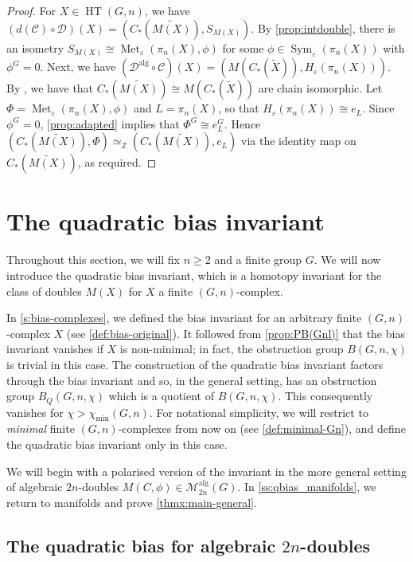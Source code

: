 \documentclass[11pt,a4paper,leqno]{amsart}
\theoremstyle{definition}
\theoremstyle{remark}
\newcommand{\wt}{\widetilde}
\newcommand{\Z}{\mathbb{Z}}
\DeclareMathOperator{\HT}{HT}
\DeclareMathOperator{\alg}{alg}
\newcommand{\Malg}{\mathscr{M}^{\alg}}
\newcommand{\dalg}{\mathscr{D}^{\alg}}
\DeclareMathOperator{\Met}{Met}
\newcommand{\ep}{\varepsilon}
\DeclareMathOperator{\Sym}{Sym}
\begin{document}
\begin{proof}
For $X \in \HT(G,n)$, we have $(d(\mathscr{C}) \circ \mathscr{D})(X) = (C_*(\wt{M(X)}), S_{M(X)})$. By \cref{prop:intdouble}, there is an isometry $S_{M(X)} \cong \Met_\ep(\pi_n(X), \phi)$ for some $\phi\in \Sym_\ep(\pi_n(X))$ with $\phi^G = 0$.
Next, we have $(\dalg \circ \mathscr{C})(X) = (M(C_*(\wt X)),H_\ep(\pi_n(X)))$. By \cite[Proposition II.3]{Kreck:1984}, we have that $C_*(\wt{M(X)}) \cong M(C_*(\wt X))$ are chain isomorphic. 
Let $\Phi = \Met_\ep(\pi_n(X), \phi)$ and $L = \pi_n(X)$, so that $H_\ep(\pi_n(X)) \cong e_L$. Since $\phi^G = 0$, \cref{prop:adapted} implies that $\Phi^G \cong e_L^G$. Hence  $(C_*(\wt{M(X)}),\Phi) \simeq_{\Z} (C_*(\wt{M(X)}),e_L)$ via the identity map on $C_*(\wt{M(X)})$, as required.
\end{proof}

\section{The quadratic bias invariant} \label{s:bias-manifolds}

Throughout this section, we will fix $n \ge 2$ and a finite group $G$. 
We will now introduce the quadratic bias invariant, which is a homotopy invariant for the class of doubles $M(X)$ for $X$ a finite $(G,n)$-complex.

In \cref{s:bias-complexes}, we defined the bias invariant for an arbitrary finite $(G,n)$-complex $X$ (see \cref{def:bias-original}). It followed from \cref{prop:PB(Gnl)} that the bias invariant vanishes if $X$ is non-minimal; in fact, the obstruction group $B(G,n,\chi)$ is trivial in this case. 
The construction of the quadratic bias invariant factors through the bias invariant and so, in the general setting, has an obstruction group $B_Q(G,n,\chi)$ which is a quotient of $B(G,n,\chi)$. This consequently vanishes for $\chi > \chi_{\min}(G,n)$. For notational simplicity, we will restrict to \emph{minimal} finite $(G,n)$-complexes from now on (see \cref{def:minimal-Gn}), and define the quadratic bias invariant only in this case.

We will begin with a polarised version of the invariant  in the more general setting of algebraic $2n$-doubles $M(C, \phi) \in \Malg_{2n}(G)$. In \cref{ss:qbias_manifolds}, we return to manifolds and prove \cref{thmx:main-general}.

\subsection{The quadratic bias for algebraic $2n$-doubles}
\end{document}
